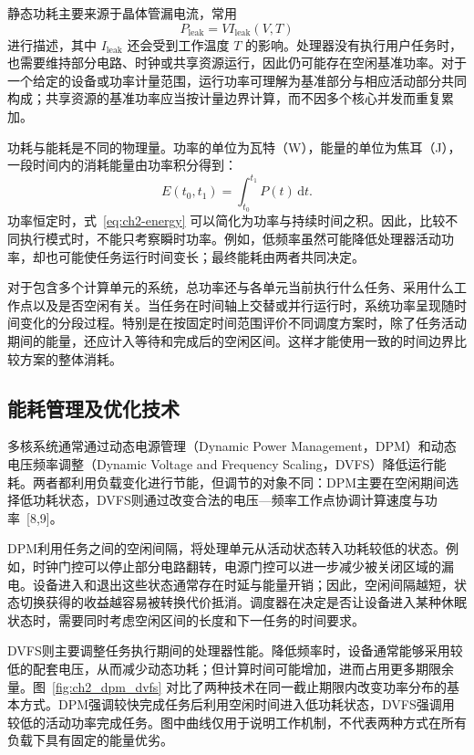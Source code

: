 静态功耗主要来源于晶体管漏电流，常用
\begin{equation}\label{eq:ch2-leak}
  P_{\mathrm{leak}}=V I_{\mathrm{leak}}(V,T)
\end{equation}
进行描述，其中 $I_{\mathrm{leak}}$ 还会受到工作温度 $T$ 的影响。处理器没有执行用户任务时，也需要维持部分电路、时钟或共享资源运行，因此仍可能存在空闲基准功率。对于一个给定的设备或功率计量范围，运行功率可理解为基准部分与相应活动部分共同构成；共享资源的基准功率应当按计量边界计算，而不因多个核心并发而重复累加。

功耗与能耗是不同的物理量。功率的单位为瓦特（W），能量的单位为焦耳（J），一段时间内的消耗能量由功率积分得到：
\begin{equation}\label{eq:ch2-energy}
  E(t_0,t_1)=\int_{t_0}^{t_1} P(t)\,\mathrm{d}t.
\end{equation}
功率恒定时，式~\eqref{eq:ch2-energy} 可以简化为功率与持续时间之积。因此，比较不同执行模式时，不能只考察瞬时功率。例如，低频率虽然可能降低处理器活动功率，却也可能使任务运行时间变长；最终能耗由两者共同决定。

对于包含多个计算单元的系统，总功率还与各单元当前执行什么任务、采用什么工作点以及是否空闲有关。当任务在时间轴上交替或并行运行时，系统功率呈现随时间变化的分段过程。特别是在按固定时间范围评价不同调度方案时，除了任务活动期间的能量，还应计入等待和完成后的空闲区间。这样才能使用一致的时间边界比较方案的整体消耗。

\subsection{能耗管理及优化技术}

多核系统通常通过动态电源管理（Dynamic Power Management，DPM）和动态电压频率调整（Dynamic Voltage and Frequency Scaling，DVFS）降低运行能耗。两者都利用负载变化进行节能，但调节的对象不同：DPM主要在空闲期间选择低功耗状态，DVFS则通过改变合法的电压—频率工作点协调计算速度与功率~[8,9]。

DPM利用任务之间的空闲间隔，将处理单元从活动状态转入功耗较低的状态。例如，时钟门控可以停止部分电路翻转，电源门控可以进一步减少被关闭区域的漏电。设备进入和退出这些状态通常存在时延与能量开销；因此，空闲间隔越短，状态切换获得的收益越容易被转换代价抵消。调度器在决定是否让设备进入某种休眠状态时，需要同时考虑空闲区间的长度和下一任务的时间要求。

DVFS则主要调整任务执行期间的处理器性能。降低频率时，设备通常能够采用较低的配套电压，从而减少动态功耗；但计算时间可能增加，进而占用更多期限余量。图~\ref{fig:ch2_dpm_dvfs} 对比了两种技术在同一截止期限内改变功率分布的基本方式。DPM强调较快完成任务后利用空闲时间进入低功耗状态，DVFS强调用较低的活动功率完成任务。图中曲线仅用于说明工作机制，不代表两种方式在所有负载下具有固定的能量优劣。


